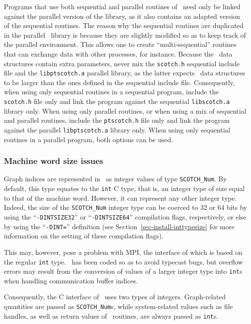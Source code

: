 Programs that use both sequential and parallel routines of
\scotch\ need only be linked against the parallel version of the
library, as it also contains an adapted version of the sequential
routines. The reason why the sequential routines are duplicated in the
parallel \ptscotch\ library is because they are slightly modified so
as to keep track of the parallel environment. This allows one to
create ``multi-sequential'' routines that can exchange data with other
processes, for instance. Because the \libscotch\ data structures
contain extra parameters, never mix the \texttt{scotch.h} sequential
include file and the \texttt{libptscotch.a} parallel library, as the
latter expects \scotch\ data structures to be larger than the ones
defined in the sequential include file. Consequently, when using only
sequential routines in a sequential program, include the
\texttt{scotch.h} file only and link the program against the sequential
\texttt{libscotch.a} library only. When using only parallel routines,
or when using a mix of sequential and parallel routines, include the
\texttt{ptscotch.h} file only and link the program against the parallel
\texttt{libptscotch.a} library only. When using only sequential
routines in a parallel program, both options can be used.

\subsubsection{Machine word size issues}
\label{sec-lib-inttypesize}

Graph indices are represented in \scotch\ as integer values of type
{\tt SCOTCH\_\lbt Num}. By default, this type equates to the {\tt int}
C type, that is, an integer type of size equal to that of
the machine word. However, it can represent any other integer
type. Indeed, the size of the {\tt SCOTCH\_\lbt Num} integer type can
be coerced to 32 or 64 bits by using the ``{\tt -DINTSIZE32}'' or
``{\tt -DINTSIZE64}'' compilation flags, respectively, or else by
using the ``{\tt -DINT=}'' definition (see
Section~\ref{sec-install-inttypesize} for more information on the
setting of these compilation flags).

This may, however, pose a problem with MPI, the interface of which is
based on the regular {\tt int} type. \ptscotch\ has been coded so
as to avoid typecast bugs, but overflow errors may result from the
conversion of values of a larger integer type into {\tt int}s when
handling communication buffer indices.

Consequently, the C interface of \scotch\ uses two types of integers.
Graph-related quantities are passed as {\tt SCOTCH\_\lbt Num}s,
while system-related values such as file handles, as well as
return values of \libscotch\ routines, are always passed as
{\tt int}s.

